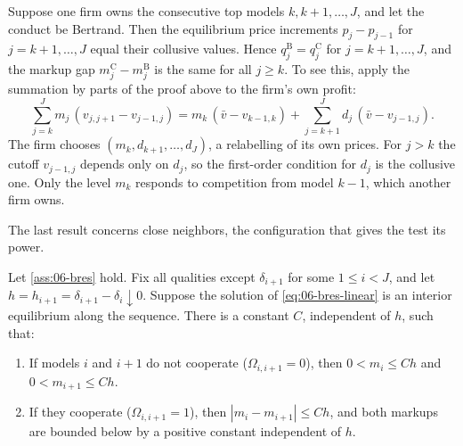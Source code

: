 \begin{remark}\label{rem:06-bres-topblock}
Suppose one firm owns the consecutive top models $k, k+1, \dots, J$, and let the conduct be Bertrand. Then the
equilibrium price increments $p_j - p_{j-1}$ for $j = k+1,\dots,J$ equal their collusive values. Hence
$q_j^{\mathrm B} = q_j^{\mathrm C}$ for $j = k+1,\dots,J$, and the markup gap $m_j^{\mathrm C} - m_j^{\mathrm B}$ is the
same for all $j \ge k$. To see this, apply the summation by parts of the proof above to the firm's own profit:
\begin{equation*}
  \sum_{j=k}^J m_j\,(v_{j,j+1} - v_{j-1,j})
  = m_k\,(\bar v - v_{k-1,k}) + \sum_{j=k+1}^J d_j\,(\bar v - v_{j-1,j}).
\end{equation*}
The firm chooses $(m_k, d_{k+1},\dots,d_J)$, a relabelling of its own prices. For $j > k$ the cutoff
$v_{j-1,j}$ depends only on $d_j$, so the first-order condition for $d_j$ is the collusive one. Only
the level $m_k$ responds to competition from model $k-1$, which another firm owns.
\end{remark}

The last result concerns close neighbors, the configuration that gives the test its power.

\begin{proposition}\label{prop:06-bertrand-limit}
Let \cref{ass:06-bres} hold. Fix all qualities except $\delta_{i+1}$ for some $1 \le i < J$, and let
$h = h_{i+1} = \delta_{i+1} - \delta_i \downarrow 0$. Suppose the solution of \eqref{eq:06-bres-linear} is an interior
equilibrium along the sequence. There is a constant $C$, independent of $h$, such that:
\begin{enumerate}[label=(\alph*)]
\item If models $i$ and $i+1$ do not cooperate ($\Omega_{i,i+1} = 0$), then $0 < m_i \le C h$ and $0 < m_{i+1} \le C h$.
\item If they cooperate ($\Omega_{i,i+1} = 1$), then $|m_i - m_{i+1}| \le C h$, and both markups are bounded below by a
positive constant independent of $h$.
\end{enumerate}
\end{proposition}

